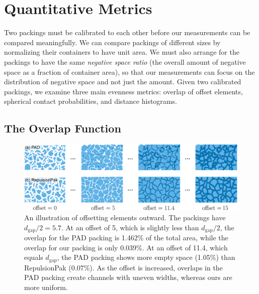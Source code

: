 \section{Quantitative Metrics}


Two packings must be calibrated to each other before our measurements 
can be compared meaningfully.  
We can compare packings of different sizes by normalizing their containers to
have unit area.  We must also arrange for the packings to have the same
\textit{negative space ratio} 
(the overall amount of negative space as a 
fraction of container area), so that our measurements can focus on the
distribution of negative space and not just the amount.  Given two
calibrated packings, we examine three main evenness metrics:
overlap of offset elements, spherical contact probabilities,
and distance histograms. 

\subsection{The Overlap Function}

\begin{figure}[t]
\centering
\includegraphics[width=1.0\textwidth]{figures/metrics/overlap_metric.pdf}
\caption[An illustration of offsetting elements outward]
{\label{fig_overlap_function}
    An illustration of offsetting elements outward. The packings have $d_\mathrm{gap} / 2 = 5.7$.  
    At an offset of 5, which is slightly less than $d_\mathrm{gap} / 2$,
    the overlap for the PAD packing is 1.462\% of the total area, while the overlap for our packing is only 0.039\%.
    At an offset of 11.4, which equals $d_\mathrm{gap}$, the PAD packing shows more empty space (1.05\%) than RepulsionPak (0.07\%).
    As the offset is increased, overlaps in the PAD packing create channels
  with uneven widths, whereas ours are more uniform.
  }
\end{figure}

